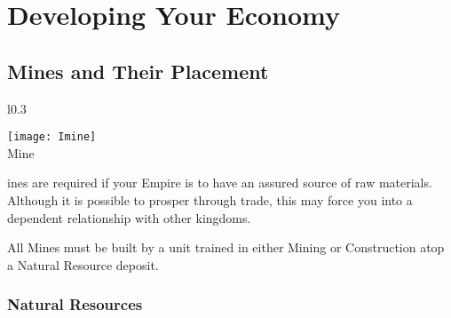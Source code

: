 
\chapter{Developing Your Economy}


\section{Mines and Their Placement}


\begin{wrapfigure}{l}{0.3\textwidth}
	\vspace{-20pt}
	\begin{center}
		\texttt{[image: Imine]} %
		\\ Mine
	\end{center}
	\vspace{-30pt} %
\end{wrapfigure}

ines are required if your Empire is to have an assured source of raw materials. Although it is possible to prosper through trade, this may force you into a dependent relationship with other kingdoms.

All Mines must be built by a unit trained in either Mining or Construction atop a Natural Resource deposit. \\ %

\subsection{Natural Resources}

